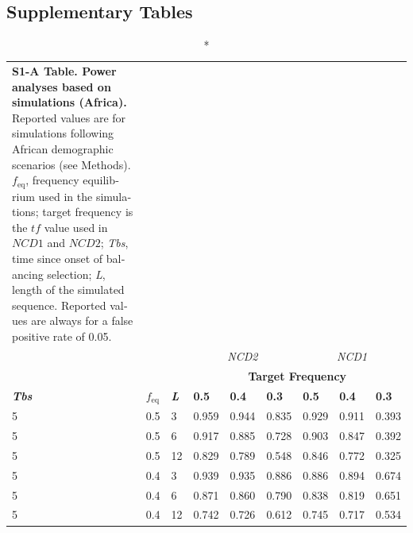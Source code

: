 \begin{refsection}
\begin{otherlanguage}{english}
\section{Supplementary Tables}
\begin{scriptsize}
\begin{longtable}{lllllllll}
\caption*{\textbf{S1-A Table. Power analyses based on simulations (Africa).} Reported values are for simulations following African demographic scenarios (see Methods). $f_{\mathrm{eq}}$, frequency equilibrium used in the simulations; target frequency is the $tf$ value used in $NCD1$ and $NCD2$; \emph{Tbs}, time since onset of balancing selection; \emph{L}, length of the simulated sequence. Reported values are always for a false positive rate of 0.05.}\\
\cline{4-9}
\multicolumn{3}{l}{} & \multicolumn{3}{c}{\cellcolor[HTML]{C0C0C0}\textit{NCD2}} & \multicolumn{3}{c}{\cellcolor[HTML]{C0C0C0}\textit{NCD1}} \\ \cline{4-9} 
\multicolumn{3}{l}{} & \multicolumn{6}{c}{\cellcolor[HTML]{9B9B9B}\textbf{Target Frequency}} \\
\cellcolor[HTML]{9B9B9B}\textit{\textbf{Tbs}} & \cellcolor[HTML]{9B9B9B}\textit{\textbf{$f_{\mathrm{eq}}$}} & \cellcolor[HTML]{9B9B9B}\textit{\textbf{L}} & \textbf{0.5} & \textbf{0.4} & \textbf{0.3} & \textbf{0.5} & \textbf{0.4} & \textbf{0.3} \\
\cellcolor[HTML]{C0C0C0}5 & \cellcolor[HTML]{C0C0C0}0.5 & \cellcolor[HTML]{C0C0C0}3 & 0.959 & 0.944 & 0.835 & 0.929 & 0.911 & 0.393 \\
\cellcolor[HTML]{C0C0C0}5 & \cellcolor[HTML]{C0C0C0}0.5 & \cellcolor[HTML]{C0C0C0}6 & 0.917 & 0.885 & 0.728 & 0.903 & 0.847 & 0.392 \\
\cellcolor[HTML]{C0C0C0}5 & \cellcolor[HTML]{C0C0C0}0.5 & \cellcolor[HTML]{C0C0C0}12 & 0.829 & 0.789 & 0.548 & 0.846 & 0.772 & 0.325 \\
\cellcolor[HTML]{C0C0C0}5 & \cellcolor[HTML]{C0C0C0}0.4 & \cellcolor[HTML]{C0C0C0}3 & 0.939 & 0.935 & 0.886 & 0.886 & 0.894 & 0.674 \\
\cellcolor[HTML]{C0C0C0}5 & \cellcolor[HTML]{C0C0C0}0.4 & \cellcolor[HTML]{C0C0C0}6 & 0.871 & 0.860 & 0.790 & 0.838 & 0.819 & 0.651 \\
\cellcolor[HTML]{C0C0C0}5 & \cellcolor[HTML]{C0C0C0}0.4 & \cellcolor[HTML]{C0C0C0}12 & 0.742 & 0.726 & 0.612 & 0.745 & 0.717 & 0.534 \\

\end{longtable}
\end{scriptsize}
\end{otherlanguage}
\end{refsection}
